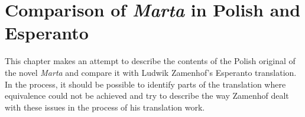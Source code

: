 \chapter{Comparison of \textit{Marta} in Polish and Esperanto}

This chapter makes an attempt to describe the contents of the Polish original of the novel \textit{Marta} and compare it with Ludwik Zamenhof's Esperanto translation.
In the process, it should be possible to identify parts of the translation where equivalence could not be achieved and try to describe the way Zamenhof dealt with these issues in the process of his translation work.